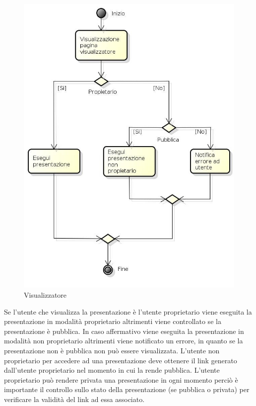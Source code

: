 \begin{figure}[h!]
		\centering
		\includegraphics[scale=.5]{img/Visualizzatore.jpg}
		\caption{Visualizzatore}
		\label{fig:Visualizzatore}
\end{figure} 

Se l'utente che visualizza la presentazione è l'utente proprietario viene eseguita la presentazione in modalità proprietario altrimenti viene controllato se la presentazione è pubblica. In caso affermativo viene eseguita la presentazione in modalità non proprietario altrimenti viene notificato un errore, in quanto se la presentazione non è pubblica non può essere visualizzata. L'utente non proprietario per accedere ad una presentazione deve ottenere il link generato dall'utente proprietario nel momento in cui la rende pubblica. L'utente proprietario può rendere privata una presentazione in ogni momento perciò è importante il controllo sullo stato della presentazione (se pubblica o privata) per verificare la validità del link ad essa associato.

